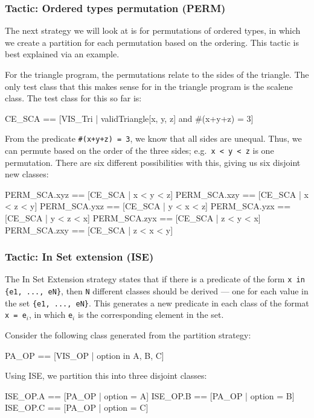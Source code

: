 \subsubsection{Tactic: Ordered types permutation (PERM)}

The next strategy we will look at is for permutations of ordered types, in which we create a partition for each permutation based on the ordering.  This tactic is best explained via an example.

\begin{example}
For the triangle program, the permutations relate to the sides of the triangle. The only test class that this makes sense for in the triangle program is the scalene class. The test class for this so far is:

\lstset{aboveskip=3mm}
\lstset{language=}
\begin{alloy}
 CE_SCA == [VIS_Tri | validTriangle[x, y, z] and #(x+y+z) = 3]
\end{alloy}

From the predicate \texttt{\#(x+y+z) = 3}, we know that all sides are unequal. Thus, we can permute based on the order of the three sides; e.g.\ \verb+x < y < z+ is one permutation. There are six different possibilities with this, giving us six disjoint new classes:

\lstset{aboveskip=3mm}
\lstset{language=}
\begin{alloy}
 PERM_SCA.xyz == [CE_SCA | x < y < z]
 PERM_SCA.xzy == [CE_SCA | x < z < y]
 PERM_SCA.yxz == [CE_SCA | y < x < z]
 PERM_SCA.yzx == [CE_SCA | y < z < x]
 PERM_SCA.zyx == [CE_SCA | z < y < x]
 PERM_SCA.zxy == [CE_SCA | z < x < y]
\end{alloy}
\end{example}

\subsubsection{Tactic: In Set extension (ISE)}

The In Set Extension strategy states that if there is a predicate of the form \verb+x in {e1, ..., eN}+, then \texttt{N} different classes should be derived --- one for each value in the set \verb+{e1, ..., eN}+. This generates a new predicate in each class of the format \verb+x = e+$_i$, in which \texttt{e}$_i$ is the corresponding element in the set.

\begin{example}
Consider the following class generated from the partition strategy:

\lstset{aboveskip=3mm}
\lstset{language=}
\begin{alloy}
 PA_OP == [VIS_OP | option in {A, B, C}]
\end{alloy}

Using ISE, we partition this into three disjoint classes:

\lstset{aboveskip=3mm}
\lstset{language=}
\begin{alloy}
 ISE_OP.A == [PA_OP | option = A]
 ISE_OP.B == [PA_OP | option = B]
 ISE_OP.C == [PA_OP | option = C]
\end{alloy}
\end{example}

